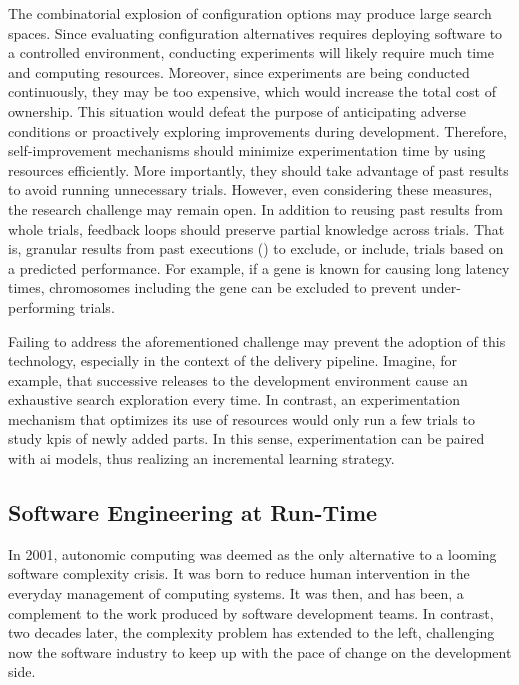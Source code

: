 The combinatorial explosion of configuration options may produce large search spaces. Since evaluating configuration alternatives requires deploying software to a controlled environment, conducting experiments will likely require much time and computing resources. Moreover, since experiments are being conducted continuously, they may be too expensive, which would increase the total cost of ownership. This situation would defeat the purpose of anticipating adverse conditions or proactively exploring improvements during development. Therefore, self-improvement mechanisms should minimize experimentation time by using resources efficiently. More importantly, they should take advantage of past results to avoid running unnecessary trials. However, even considering these measures, the research challenge may remain open. In addition to reusing past results from whole trials, feedback loops should preserve partial knowledge across trials. That is, granular results from past executions () to exclude, or include, trials based on a predicted performance. For example, if a gene is known for causing long latency times, chromosomes including the gene can be excluded to prevent under-performing trials.

Failing to address the aforementioned challenge may prevent the adoption of this technology, especially in the context of the delivery pipeline. Imagine, for example, that successive releases to the development environment cause an exhaustive search exploration every time. In contrast, an experimentation mechanism that optimizes its use of resources would only run a few trials to study \glspl{kpi} of newly added parts. In this sense, experimentation can be paired with \gls{ai} models, thus realizing an incremental learning strategy.

%

\subsection{Software Engineering at Run-Time}
\label{subsect:conclusions--software-engineering-at-run-time}

In 2001, autonomic computing was deemed as the only alternative to a looming software complexity crisis. It was born to reduce human intervention in the everyday management of computing systems. It was then, and has been, a complement to the work produced by software development teams. In contrast, two decades later, the complexity problem has extended to the left, challenging now the software industry to keep up with the pace of change on the development side.

